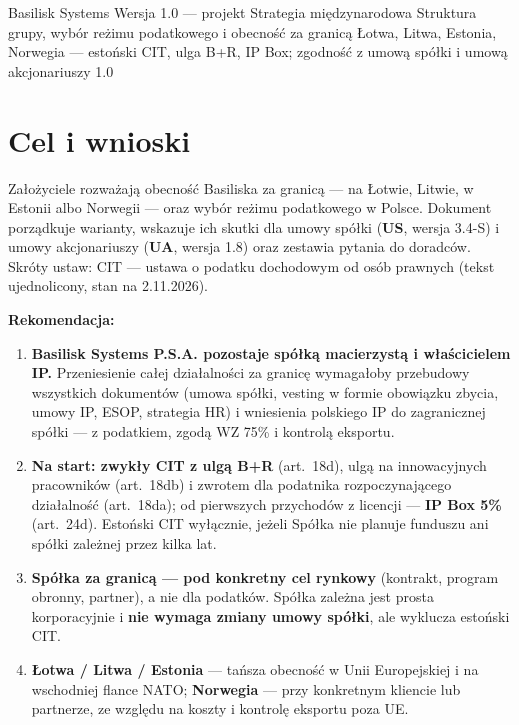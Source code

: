 \documentclass[11pt,a4paper]{report}
\begin{document}
\BusinessPlanTitlePage
  {Basilisk Systems}
  {Wersja 1.0 --- projekt}
  {Strategia międzynarodowa}
  {Struktura grupy, wybór reżimu podatkowego i obecność za granicą}
  {Łotwa, Litwa, Estonia, Norwegia --- estoński CIT, ulga B+R, IP Box; zgodność z umową spółki i umową akcjonariuszy}
  {1.0}

\tableofcontents
\newpage

\section{Cel i wnioski}

Założyciele rozważają obecność Basiliska za granicą --- na Łotwie, Litwie, w Estonii albo Norwegii --- oraz wybór reżimu podatkowego w Polsce. Dokument porządkuje warianty, wskazuje ich skutki dla umowy spółki (\textbf{US}, wersja 3.4-S) i umowy akcjonariuszy (\textbf{UA}, wersja 1.8) oraz zestawia pytania do doradców. Skróty ustaw: CIT --- ustawa o podatku dochodowym od osób prawnych (tekst ujednolicony, stan na 2.11.2026).

\begin{Decyzja}
\textbf{Rekomendacja:}
\begin{enumerate}
  \item \textbf{Basilisk Systems P.S.A. pozostaje spółką macierzystą i właścicielem IP.} Przeniesienie całej działalności za granicę wymagałoby przebudowy wszystkich dokumentów (umowa spółki, vesting w formie obowiązku zbycia, umowy IP, ESOP, strategia HR) i wniesienia polskiego IP do zagranicznej spółki --- z podatkiem, zgodą WZ 75\% i kontrolą eksportu.
  \item \textbf{Na start: zwykły CIT z ulgą B+R} (art.~18d), ulgą na innowacyjnych pracowników (art.~18db) i zwrotem dla podatnika rozpoczynającego działalność (art.~18da); od pierwszych przychodów z licencji --- \textbf{IP Box 5\%} (art.~24d). Estoński CIT wyłącznie, jeżeli Spółka nie planuje funduszu ani spółki zależnej przez kilka lat.
  \item \textbf{Spółka za granicą --- pod konkretny cel rynkowy} (kontrakt, program obronny, partner), a nie dla podatków. Spółka zależna jest prosta korporacyjnie i \textbf{nie wymaga zmiany umowy spółki}, ale wyklucza estoński CIT.
  \item \textbf{Łotwa / Litwa / Estonia} --- tańsza obecność w Unii Europejskiej i na wschodniej flance NATO; \textbf{Norwegia} --- przy konkretnym kliencie lub partnerze, ze względu na koszty i kontrolę eksportu poza UE.
\end{enumerate}
\end{Decyzja}
\end{document}

